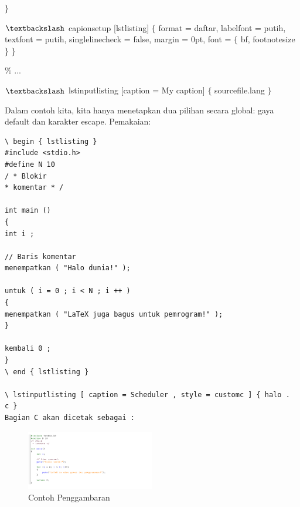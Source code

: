  $ \} $\par

 $\textbackslash$ capionsetup [lstlisting] $ \{ $ format = daftar, labelfont = putih, textfont = putih, singlelinecheck = false, margin = 0pt, font = $ \{ $ bf, footnotesize $ \} $ $ \} $\par

 $\%$ ...\par

 $\textbackslash$ lstinputlisting [caption = My caption] $ \{ $ sourcefile.lang $ \} $\par
 
 \noindent
 Dalam contoh kita, kita hanya menetapkan dua pilihan secara global: gaya default dan karakter escape. Pemakaian: \par
 
 \begin{verbatim}
\ begin { lstlisting }
#include <stdio.h>
#define N 10
/ * Blokir
* komentar * /

int main ()
{
int i ;

// Baris komentar
menempatkan ( "Halo dunia!" );

untuk ( i = 0 ; i < N ; i ++ )
{
menempatkan ( "LaTeX juga bagus untuk pemrogram!" );
}

kembali 0 ;
}
\ end { lstlisting }

\ lstinputlisting [ caption = Scheduler , style = customc ] { halo .  c }
Bagian C akan dicetak sebagai :
 \end{verbatim}
 
\begin{figure}[ht]
	\centerline{\includegraphics[width=0.50\textwidth]{gambar/contoh3}}
	\caption{Contoh Penggambaran}
	\label{contoh3}
\end{figure}